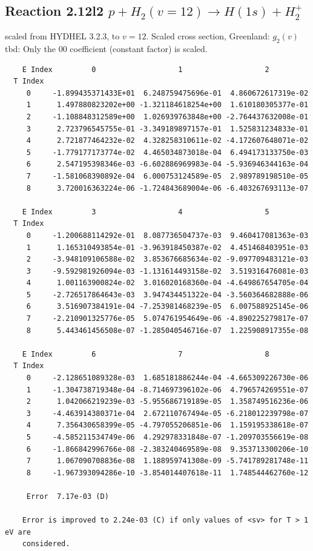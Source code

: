 \documentclass[12pt,dvipdfmx]{article}
\begin{document}
\subsection{
Reaction 2.12l2 $   p + H_2(v=12) \rightarrow H(1s) + H_2^+$}
scaled from HYDHEL 3.2.3, to $v=12$. Scaled cross section, Greenland: $g_2(v)$
tbd:
Only the 00 coefficient (constant factor) is scaled.


\begin{small}\begin{verbatim}
    E Index         0                   1                   2
  T Index
     0     -1.899435371433E+01  6.248759475696e-01  4.860672617319e-02
     1      1.497880823202e+00 -1.321184618254e+00  1.610180305377e-01
     2     -1.108848312589e+00  1.026939763848e+00 -2.764437632008e-01
     3      2.723796545755e-01 -3.349189897157e-01  1.525831234833e-01
     4      2.721877464232e-02  4.328258310611e-02 -4.172607648071e-02
     5     -1.779177173774e-02  4.465034873018e-04  6.494173133750e-03
     6      2.547195398346e-03 -6.602886969983e-04 -5.936946344163e-04
     7     -1.581068390892e-04  6.000753124589e-05  2.989789198510e-05
     8      3.720016363224e-06 -1.724843689004e-06 -6.403267693113e-07

    E Index         3                   4                   5
  T Index
     0     -1.200688114292e-01  8.087736504737e-03  9.460417081363e-03
     1      1.165310493854e-01 -3.963918450387e-02  4.451468403951e-03
     2     -3.948109106588e-02  3.853676685634e-02 -9.097709483121e-03
     3     -9.592981926094e-03 -1.131614493158e-02  3.519316476081e-03
     4      1.001163900824e-02  3.016020168360e-04 -4.649867654705e-04
     5     -2.726517864643e-03  3.947434451322e-04 -3.560364682888e-06
     6      3.516907384191e-04 -7.253981468239e-05  6.007588925145e-06
     7     -2.210901325776e-05  5.074761954649e-06 -4.890225279817e-07
     8      5.443461456508e-07 -1.285040546716e-07  1.225908917355e-08

    E Index         6                   7                   8
  T Index
     0     -2.128651089328e-03  1.685181886244e-04 -4.665309226730e-06
     1     -1.304738719348e-04 -8.714697396102e-06  4.796574269551e-07
     2      1.042066219239e-03 -5.955686719189e-05  1.358749516236e-06
     3     -4.463914380371e-04  2.672110767494e-05 -6.218012239798e-07
     4      7.356430658399e-05 -4.797055206851e-06  1.159195338618e-07
     5     -4.585211534749e-06  4.292978331848e-07 -1.209703556619e-08
     6     -1.866842996766e-08 -2.383240469589e-08  9.353713300206e-10
     7      1.067090708836e-08  1.188959741308e-09 -5.741789281748e-11
     8     -1.967393094286e-10 -3.854014407618e-11  1.748544462760e-12

     Error  7.17e-03 (D)

    Error is improved to 2.24e-03 (C) if only values of <sv> for T > 1 eV are
    considered.
\end{verbatim}\end{small}
\newpage
\end{document}
